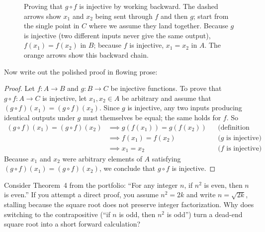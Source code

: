 \begin{figure}[htbp]
\caption{Proving that $g \circ f$ is injective by working backward. The dashed arrows show $x_1$ and $x_2$ being sent through $f$ and then $g$; start from the single point in $C$ where we assume they land together. Because $g$ is injective (two different inputs never give the same output), $f(x_1) = f(x_2)$ in $B$; because $f$ is injective, $x_1 = x_2$ in $A$. The orange arrows show this backward chain.}
\label{26:fig-injective-composition}
\end{figure}

Now write out the polished proof in flowing prose:

\begin{proof}
Let $f: A \to B$ and $g: B \to C$ be injective functions. To prove that $g \circ f: A \to C$ is injective, let $x_1, x_2 \in A$ be arbitrary and assume that $(g \circ f)(x_1) = (g \circ f)(x_2)$. Since $g$ is injective, any two inputs producing identical outputs under $g$ must themselves be equal; the same holds for $f$. So
\begin{align*}
(g \circ f)(x_1) = (g \circ f)(x_2)
  &\implies g(f(x_1)) = g(f(x_2)) && \text{(definition of composition)} \\
  &\implies f(x_1) = f(x_2) && \text{($g$ is injective)} \\
  &\implies x_1 = x_2 && \text{($f$ is injective)}.
\end{align*}
Because $x_1$ and $x_2$ were arbitrary elements of $A$ satisfying $(g \circ f)(x_1) = (g \circ f)(x_2)$, we conclude that $g \circ f$ is injective.
\end{proof}

\begin{walkbox}
Consider Theorem~4 from the portfolio: ``For any integer $n$, if $n^2$ is even, then $n$ is even.'' If you attempt a direct proof, you assume $n^2 = 2k$ and write $n = \sqrt{2k}$, stalling because the square root does not preserve integer factorization. Why does switching to the contrapositive (``if $n$ is odd, then $n^2$ is odd'') turn a dead-end square root into a short forward calculation?
\end{walkbox}

